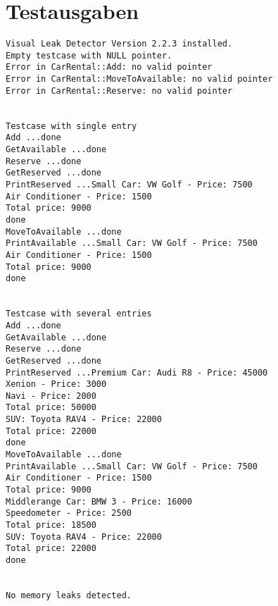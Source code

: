 \documentclass[12pt,a4paper]{article}
\begin{document}
\section {Testausgaben} 

\begin {verbatim}
Visual Leak Detector Version 2.2.3 installed.
Empty testcase with NULL pointer.
Error in CarRental::Add: no valid pointer
Error in CarRental::MoveToAvailable: no valid pointer
Error in CarRental::Reserve: no valid pointer


Testcase with single entry
Add ...done
GetAvailable ...done
Reserve ...done
GetReserved ...done
PrintReserved ...Small Car: VW Golf - Price: 7500
Air Conditioner - Price: 1500
Total price: 9000
done
MoveToAvailable ...done
PrintAvailable ...Small Car: VW Golf - Price: 7500
Air Conditioner - Price: 1500
Total price: 9000
done


Testcase with several entries
Add ...done
GetAvailable ...done
Reserve ...done
GetReserved ...done
PrintReserved ...Premium Car: Audi R8 - Price: 45000
Xenion - Price: 3000
Navi - Price: 2000
Total price: 50000
SUV: Toyota RAV4 - Price: 22000
Total price: 22000
done
MoveToAvailable ...done
PrintAvailable ...Small Car: VW Golf - Price: 7500
Air Conditioner - Price: 1500
Total price: 9000
Middlerange Car: BMW 3 - Price: 16000
Speedometer - Price: 2500
Total price: 18500
SUV: Toyota RAV4 - Price: 22000
Total price: 22000
done


No memory leaks detected.
\end {verbatim}
\end{document}
